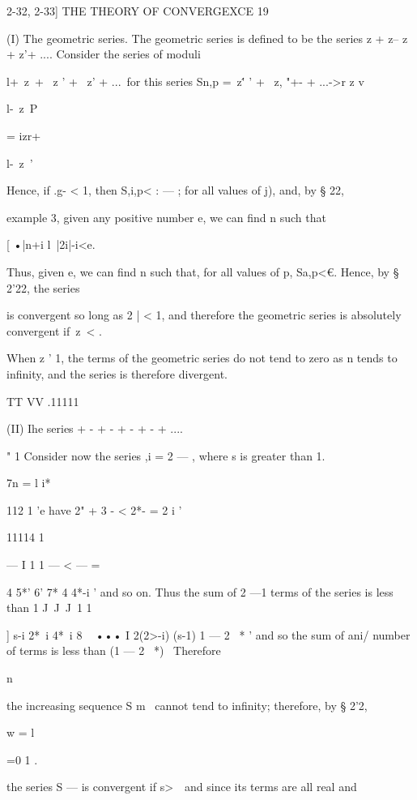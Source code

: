 2-32, 2-33] THE THEORY OF CONVERGEXCE 19 

(I) The geometric series. 
The geometric series is defined to be the series 
  z + z-- z  + z'+ .... 
Consider the series of moduli 

l+\ z\ + \ z ' + \ z' + ...\ 
for this series Sn,p =\ z\'' '  + \ z, "+- + ...->r z  v 

l-\ z\ P 



= izr+  



l-\ z\ ' 



Hence, if .g- < 1, then S,i,p< :  — ; for all values of j), and, by § 22, 

example 3, given any positive number e, we can find n such that 

[ •|n+i l\ |2i|-i<e. 

Thus, given e, we can find n such that, for all values of p, Sa,p<€. Hence, 
by § 2'22, the series 

is convergent so long as 2 | < 1, and therefore the geometric series is absolutely 
convergent if\ z\ < .  

When z ' 1, the terms of the geometric series do not tend to zero as n 
tends to infinity, and the series is therefore divergent. 

TT VV .11111 

(II) Ihe series   + - + - +  - + - + .... 

" 1 
Consider now the series  ,i = 2 — , where s is greater than 1. 

7n = l  i* 

112 1 
 'e have 2"  + 3 - < 2*- = 2 i ' 

11114 1 

— I 1 1 — < — = 

4  5*' 6' 7* 4  4*-i ' 
and so on. Thus the sum of 2 —1 terms of the series is less than 
1 J\  J\  J\  1 1 



] s-i 2*~i 4*~i 8 ~  ••• I 2(2>-i) (s-1) 1 — 2 ~* ' 
and so the sum of ani/ number of terms is less than (1 — 2 ~*)~  Therefore 

n 

the increasing sequence S m~  cannot tend to infinity; therefore, by § 2'2, 

w = l 

=0 1 . 

the series S — is convergent if s>\ \  and since its terms are all real and 

